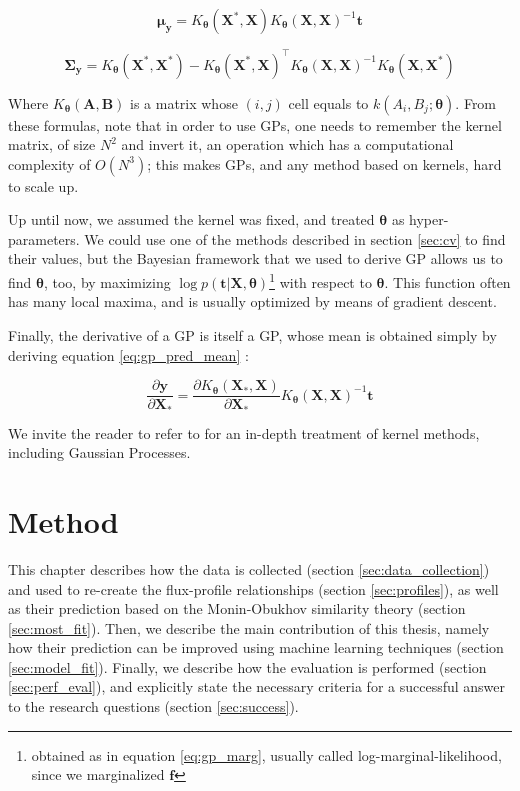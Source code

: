 \documentclass[a4paper]{book}
\begin{document}
\begin{equation}
\label{eq:gp_pred_mean}
\bm\mu_{\bm y}=K_{\bm\theta}(\bm X^*,\bm X) K_{\bm\theta}(\bm X,\bm X)^{-1}\bm t
\end{equation}

\begin{equation}
\bm\Sigma_{\bm y}=K_{\bm\theta}(\bm X^*,\bm X^*)-K_{\bm\theta}(\bm X^*,\bm X)^\intercal K_{\bm\theta}(\bm X, \bm X)^{-1}K_{\bm\theta}(\bm X,\bm X^*)
\end{equation}

Where $K_{\bm\theta}(\bm A,\bm B)$ is a matrix whose $(i,j)$ cell equals to $k(A_i,B_j;\bm\theta)$. From these formulas, note that in order to use GPs, one needs to remember the kernel matrix, of size $N^2$ and invert it, an operation which has a computational complexity of $O(N^3)$; this makes GPs, and any method based on kernels, hard to scale up.

Up until now, we assumed the kernel was fixed, and treated $\bm\theta$ as hyper-parameters. We could use one of the methods described in section \ref{sec:cv} to find their values, but the Bayesian framework that we used to derive GP allows us to find $\bm\theta$, too, by maximizing $\log p(\bm t\vert\bm X,\bm\theta)$\footnote{obtained as in equation \ref{eq:gp_marg}, usually called log-marginal-likelihood, since we marginalized $\bm f$} with respect to $\bm\theta$. This function often has many local maxima, and is usually optimized by means of gradient descent.

Finally, the derivative of a GP is itself a GP, whose mean is obtained simply by deriving equation \ref{eq:gp_pred_mean} \citep{gp_diff}:

\begin{equation}
\label{eq:gp_gradient}
\frac{\partial\bm y}{\partial\bm X_*}=\frac{\partial K_{\bm\theta}(\bm X_*,\bm X)}{\partial\bm X_*}K_{\bm\theta}(\bm X,\bm X)^{-1}\bm t
\end{equation}

We invite the reader to refer to \cite[Chapter~6]{bishop} for an in-depth treatment of kernel methods, including Gaussian Processes.


\chapter{Method}
\label{ch:method}
This chapter describes how the data is collected (section \ref{sec:data_collection}) and used to re-create the flux-profile relationships (section \ref{sec:profiles}), as well as their prediction based on the Monin-Obukhov similarity theory (section \ref{sec:most_fit}). Then, we describe the main contribution of this thesis, namely how their prediction can be improved using machine learning techniques (section \ref{sec:model_fit}). Finally, we describe how the evaluation is performed (section \ref{sec:perf_eval}), and explicitly state the necessary criteria for a successful answer to the research questions (section  \ref{sec:success}).
\end{document}

